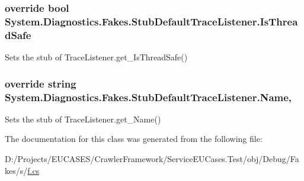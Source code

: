 \hypertarget{class_system_1_1_diagnostics_1_1_fakes_1_1_stub_default_trace_listener_a4b8963b9ada6db1c5176eeeaaf83cacf}{
\subsubsection[{Is\-Thread\-Safe}]{\setlength{\rightskip}{0pt plus 5cm}override bool System.\-Diagnostics.\-Fakes.\-Stub\-Default\-Trace\-Listener.\-Is\-Thread\-Safe\hspace{0.3cm}{\ttfamily [get]}}}\label{class_system_1_1_diagnostics_1_1_fakes_1_1_stub_default_trace_listener_a4b8963b9ada6db1c5176eeeaaf83cacf}


Sets the stub of Trace\-Listener.\-get\-\_\-\-Is\-Thread\-Safe()

\hypertarget{class_system_1_1_diagnostics_1_1_fakes_1_1_stub_default_trace_listener_a083be8848be9773b39c1e02b209b29bf}{
\subsubsection[{Name}]{\setlength{\rightskip}{0pt plus 5cm}override string System.\-Diagnostics.\-Fakes.\-Stub\-Default\-Trace\-Listener.\-Name\hspace{0.3cm}{\ttfamily [get]}, {\ttfamily [set]}}}\label{class_system_1_1_diagnostics_1_1_fakes_1_1_stub_default_trace_listener_a083be8848be9773b39c1e02b209b29bf}


Sets the stub of Trace\-Listener.\-get\-\_\-\-Name()



The documentation for this class was generated from the following file\-:\begin{DoxyCompactItemize}
\item 
D\-:/\-Projects/\-E\-U\-C\-A\-S\-E\-S/\-Crawler\-Framework/\-Service\-E\-U\-Cases.\-Test/obj/\-Debug/\-Fakes/s/\hyperlink{s_2f_8cs}{f.\-cs}\end{DoxyCompactItemize}
